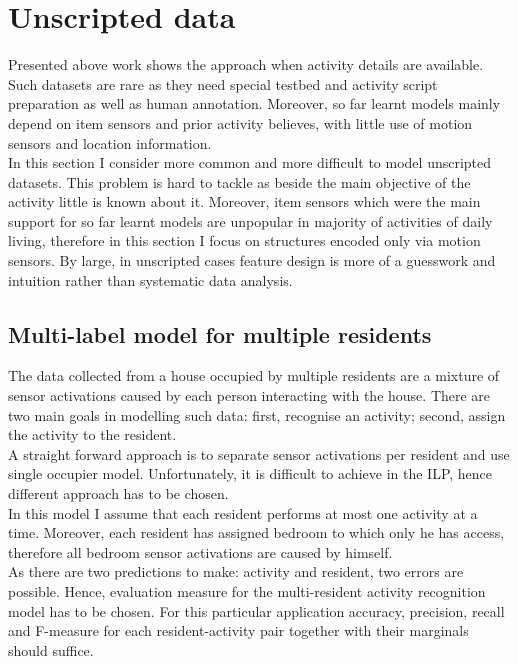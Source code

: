 \documentclass[10pt, a4paper, pdflatex, leqno, twoside, openright]{report}
\begin{document}
  \section{Unscripted data}
Presented above work shows the approach when activity details are available. Such datasets are rare as they need special testbed and activity script preparation as well as human annotation. Moreover, so far learnt models mainly depend on item sensors and prior activity believes, with little use of motion sensors and location information.\\

In this section I consider more common and more difficult to model unscripted datasets. This problem is hard to tackle as beside the main objective of the activity little is known about it. Moreover, item sensors which were the main support for so far learnt models are unpopular in majority of activities of daily living, therefore in this section I focus on structures encoded only via motion sensors. By large, in unscripted cases feature design is more of a guesswork and intuition rather than systematic data analysis.

    \subsection{Multi-label model for multiple residents\label{ch:mlm}}
The data collected from a house occupied by multiple residents are a mixture of sensor activations caused by each person interacting with the house. There are two main goals in modelling such data: first, recognise an activity; second, assign the activity to the resident.\\
A straight forward approach is to separate sensor activations per resident and use single occupier model. Unfortunately, it is difficult to achieve in the ILP, hence different approach has to be chosen.\\

In this model I assume that each resident performs at most one activity at a time. Moreover, each resident has assigned bedroom to which only he has access, therefore all bedroom sensor activations are caused by himself.\\
As there are two predictions to make: activity and resident, two errors are possible. Hence, evaluation measure for the multi-resident activity recognition model has to be chosen. For this particular application accuracy, precision, recall and F-measure for each resident-activity pair together with their marginals should suffice.\\
\end{document}
